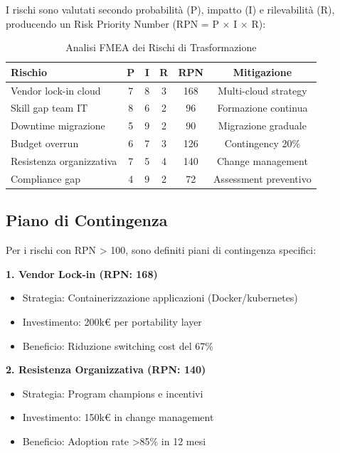 I rischi sono valutati secondo probabilità (P), impatto (I) e rilevabilità (R), producendo un Risk Priority Number (RPN = P × I × R):

\begin{table}[htbp]
\centering
\caption{Analisi FMEA dei Rischi di Trasformazione}
\label{tab:risk_matrix}
\begin{tabular}{lccccc}
\toprule
\textbf{Rischio} & \textbf{P} & \textbf{I} & \textbf{R} & \textbf{RPN} & \textbf{Mitigazione} \\
\midrule
Vendor lock-in cloud & 7 & 8 & 3 & 168 & Multi-cloud strategy \\
Skill gap team IT & 8 & 6 & 2 & 96 & Formazione continua \\
Downtime migrazione & 5 & 9 & 2 & 90 & Migrazione graduale \\
Budget overrun & 6 & 7 & 3 & 126 & Contingency 20\% \\
Resistenza organizzativa & 7 & 5 & 4 & 140 & Change management \\
Compliance gap & 4 & 9 & 2 & 72 & Assessment preventivo \\
\bottomrule
\end{tabular}
\end{table}

\subsection{\texorpdfstring{Piano di Contingenza}{3.7.2 - Piano di Contingenza}}

Per i rischi con RPN > 100, sono definiti piani di contingenza specifici:

\textbf{1. Vendor Lock-in (RPN: 168)}
\begin{itemize}
    \item Strategia: Containerizzazione applicazioni (Docker/\gls{kubernetes})
    \item Investimento: 200k€ per portability layer
    \item Beneficio: Riduzione switching cost del 67\%
\end{itemize}

\textbf{2. Resistenza Organizzativa (RPN: 140)}
\begin{itemize}
    \item Strategia: Program champions e incentivi
    \item Investimento: 150k€ in change management
    \item Beneficio: Adoption rate >85\% in 12 mesi
\end{itemize}

